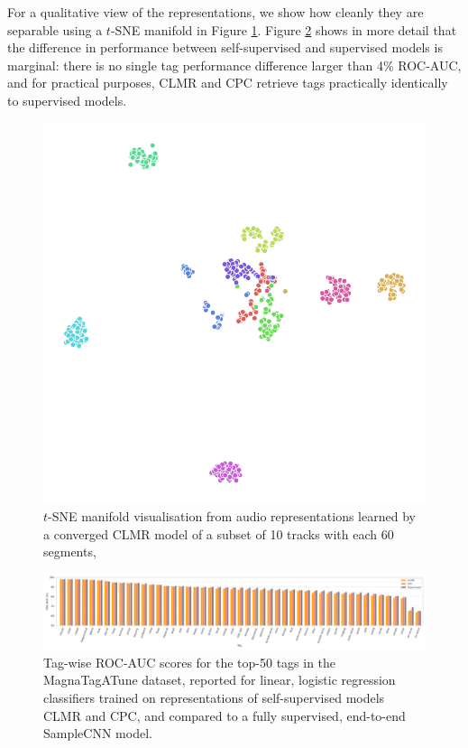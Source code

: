 \documentclass{report}
\begin{document}
For a qualitative view of the representations, we show how cleanly they are  separable using a $t$-SNE manifold in Figure \ref{fig:tsne_manifold}. Figure \ref{fig:tag_scores} shows in more detail that the difference in performance between self-supervised and supervised models is marginal: there is no single tag performance difference larger than 4\% ROC-AUC, and for practical purposes, CLMR and CPC retrieve tags practically identically to supervised models.

\begin{figure}[t]
    \centering
    \includegraphics[width=0.75\columnwidth]{figs/tsne-clmr.png}
    \caption{$t$-SNE manifold visualisation from audio representations learned by a converged CLMR model of a subset of 10 tracks with each 60 segments, }
    \label{fig:tsne_manifold}
\end{figure}

\begin{figure}[t]
    \centering
    \includegraphics[width=\textwidth]{figs/tag_retrieval.png}
    \caption{Tag-wise ROC-AUC scores for the top-50 tags in the MagnaTagATune dataset, reported for linear, logistic regression classifiers trained on representations of self-supervised models CLMR and CPC, and compared to a fully supervised, end-to-end SampleCNN model.}
    \label{fig:tag_scores}
\end{figure}
\end{document}
